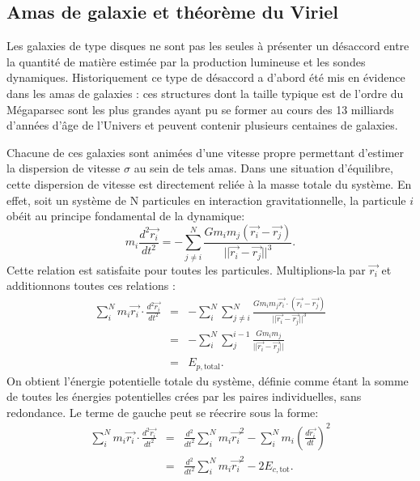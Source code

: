 \subsection{Amas de galaxie et théorème du Viriel}

Les galaxies de type disques ne sont pas les seules à présenter un désaccord entre la quantité de matière estimée par la production lumineuse et les sondes dynamiques. Historiquement ce type de désaccord a d'abord été mis en évidence dans les amas de galaxies : ces structures dont la taille typique est de l'ordre du Mégaparsec sont les plus grandes ayant pu se former au cours des 13 milliards d'années d'âge de l'Univers et peuvent contenir plusieurs centaines de galaxies.

Chacune de ces galaxies sont animées d'une vitesse propre permettant d'estimer la dispersion de vitesse $\sigma$ au sein de tels amas. Dans une situation d'équilibre, cette dispersion de vitesse est directement reliée à la masse totale du système. En effet, soit un système de N particules en interaction gravitationnelle, la particule $i$ obéit au principe fondamental de la dynamique:
\begin{equation}
m_i\frac{d^2 \vec{r_i}}{dt^2}=-\sum_{j\neq i}^N \frac{Gm_i m_j (\vec{r_i}-\vec{r_j})}{||\vec{r_i}-\vec{r_j}||^3}.
\end{equation}
Cette relation est satisfaite pour toutes les particules. Multiplions-la par $\vec{r_i}$ et additionnons toutes ces relations :
\begin{eqnarray}
\sum_i^N m_i\vec{r_i}\cdot\frac{d^2 \vec{r_i}}{dt^2}&=&-\sum_i^N \sum_{j\neq i}^N \frac{Gm_i m_j \vec{r_i}\cdot (\vec{r_i}-\vec{r_j})}{||\vec{r_i}-\vec{r_j}||^3}\\
&=& -\sum_i^N \sum_j^{i-1}\frac{Gm_i m_j}{||\vec{r_i}-\vec{r_j}||}\\
&=&E_{p,\mathrm{total}}.
\end{eqnarray}
On obtient l'énergie potentielle totale du système, définie comme étant la somme de toutes les énergies potentielles crées par les paires individuelles, sans redondance. Le terme de gauche peut se réecrire sous la forme:
\begin{eqnarray}
\sum_i^N m_i\vec{r_i}\cdot\frac{d^2 \vec{r_i}}{dt^2}&=&\frac{d^2}{dt^2}\sum_i^N m_i \vec{r_i}^2 - \sum_i^N m_i \left(\frac{d \vec{r_i}}{dt}\right)^2\\
&=&\frac{d^2}{dt^2}\sum_i^N m_i \vec{r_i}^2 - 2E_{c,\mathrm{tot}}.
\end{eqnarray}
